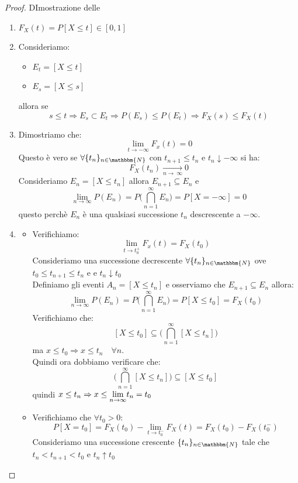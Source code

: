 \documentclass[12pt]{report}
\newcommand{\namerefl}[1]{%
	\bgroup
	\let\nmu\MakeLowercase
	\nameref{#1}\egroup}
\newcommand{\nmu}{}
\begin{document}
  	 	\begin{proof}{DImostrazione delle \namerefl{th:fun_par_prop}}
  	 		\begin{enumerate}
  	 			\item $F_X(t) = P[X\leq t] \in [0, 1]$
  	 			\item Consideriamo: \begin{itemize}
  	 				\item $E_t = [X \leq t]$
  	 				\item $E_s = [X \leq s]$
  	 			\end{itemize}
  	 			allora se \[s \leq t \Rightarrow E_s \subset E_t \Rightarrow P(E_s) \leq P(E_t) \Rightarrow F_X(s) \leq F_X(t)\]
  	 			\item Dimostriamo che:
  	 			\[
  	 			\lim_{t \to -\infty}F_x(t) = 0
  	 			\]
  	 			Questo è vero se $\forall \{t_n\}_{n \in \mathbbm{N}}$ con $t_{n+1} \leq t_n$ e $t_n \downarrow -\infty$ si ha: \[F_X(t_n) \underset{n\to\ \infty}{\to} 0 \]
  	 			Consideriamo $E_n = [X \leq t_n]$ allora $E_{n+1}\subseteq E_n$ e \[\lim_{n \to \infty}P(E_n) = P\Bigg(\bigcap_{n=1}^{\infty}E_n\Bigg) = P[X = -\infty] = 0\]
  	 			questo perchè $E_n$ è una qualsiasi successione $t_n$ descrescente a $-\infty$.
  	 			\item \begin{itemize}
  	 				\item Verifichiamo:
  	 				\[
  	 				\lim_{t \to t_0^+}F_x(t) = F_X(t_0)
  	 				\]
  	 				Consideriamo una successione decrescente $\forall \{t_n\}_{n\in\mathbbm{N}}$ ove $t_0 \leq t_{n+1} \leq t_n$ e e $t_n \downarrow t_0$ \\
  	 				Definiamo gli eventi $A_n = [X \leq t_n]$ e osserviamo che $E_{n+1} \subseteq E_n$ allora:
  	 				\[
  	 				\lim_{n \to \infty}P(E_n) = P\Bigg(\bigcap_{n=1}^{\infty}E_n\Bigg) = P[X \leq t_0] = F_X(t_0)
  	 				\]
  	 				Verifichiamo che: \[[X \leq t_0]\subseteq \Bigg(\bigcap_{n=1}^{\infty}[X \leq t_n]\Bigg)\] ma $x \leq t_0 \Rightarrow x \leq t_n \quad \forall n$. \\
  	 				Quindi ora dobbiamo verificare che: \[\Bigg(\bigcap_{n=1}^{\infty}[X \leq t_n]\Bigg)\subseteq [X \leq t_0]\] quindi $x \leq t_n \Rightarrow x \leq \mathlarger{\lim_{n \to \infty}}t_n = t_0$
  	 				\item Verifichiamo che $\forall t_0 > 0$:
  	 				\[
  	 				P[X=t_0] = F_X(t_0) - \lim_{t \to t_0^-}F_X(t) = F_X(t_0) - F_X(t_0^-)
  	 				\]
  	 				Consideriamo una successione crescente $\{t_n\}_{n\in\mathbbm{N}}$ tale che $t_n < t_{n+1} < t_0$ e $t_n \uparrow t_0$ \\

\end{itemize}
\end{enumerate}
\end{proof}
\end{document}
